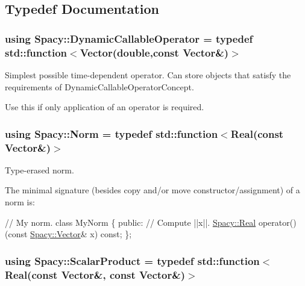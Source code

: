 \subsection{Typedef Documentation}
\hypertarget{namespaceSpacy_ad81a1e86d95b7d87a67d152fc01ee83e}{}
\subsubsection[{Dynamic\+Callable\+Operator}]{\setlength{\rightskip}{0pt plus 5cm}using {\bf Spacy\+::\+Dynamic\+Callable\+Operator} = typedef std\+::function$<${\bf Vector}(double,const {\bf Vector}\&)$>$}\label{namespaceSpacy_ad81a1e86d95b7d87a67d152fc01ee83e}


Simplest possible time-\/dependent operator. Can store objects that satisfy the requirements of Dynamic\+Callable\+Operator\+Concept. 

\label{namespaceSpacy_DynamicCallableOperatorAnchor}%
\hypertarget{namespaceSpacy_DynamicCallableOperatorAnchor}{}%
Use this if only application of an operator is required. \hypertarget{namespaceSpacy_a0dbe77a4e1282ef88017e94d50d17791}{}
\subsubsection[{Norm}]{\setlength{\rightskip}{0pt plus 5cm}using {\bf Spacy\+::\+Norm} = typedef std\+::function$<${\bf Real}(const {\bf Vector}\&)$>$}\label{namespaceSpacy_a0dbe77a4e1282ef88017e94d50d17791}


Type-\/erased norm. 

The minimal signature (besides copy and/or move constructor/assignment) of a norm is\+: 
\begin{DoxyCode}
\textcolor{comment}{// My norm.}
\textcolor{keyword}{class }MyNorm
\{
\textcolor{keyword}{public}:
  \textcolor{comment}{// Compute ||x||.}
  \hyperlink{classSpacy_1_1Real}{Spacy::Real} operator()(\textcolor{keyword}{const} \hyperlink{classSpacy_1_1Vector}{Spacy::Vector}& x) \textcolor{keyword}{const};
\};
\end{DoxyCode}
 \hypertarget{namespaceSpacy_aa995526aa0e3fa58aca8dd6772311cad}{}
\subsubsection[{Scalar\+Product}]{\setlength{\rightskip}{0pt plus 5cm}using {\bf Spacy\+::\+Scalar\+Product} = typedef std\+::function$<${\bf Real}(const {\bf Vector}\&, const {\bf Vector}\&)$>$}\label{namespaceSpacy_aa995526aa0e3fa58aca8dd6772311cad}


